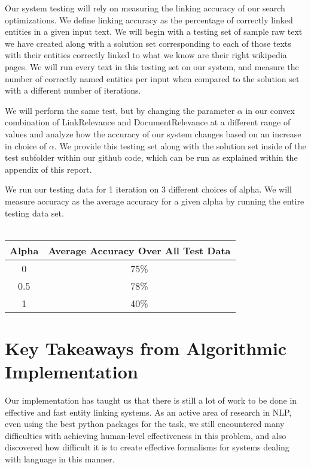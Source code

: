 \documentclass[twoside,11pt]{article}
\begin{document}
Our system testing will rely on measuring the linking accuracy of our search optimizations. We define linking accuracy as the percentage of correctly linked entities in a given input text. We will begin with a testing set of sample raw text we have created along with a solution set corresponding to each of those texts with their entities correctly linked to what we know are their right wikipedia pages. We will run every text in this testing set on our system, and measure the number of correctly named entities per input when compared to the solution set with a different number of iterations.

We will perform the same test, but by changing the parameter $\alpha$ in our convex combination of LinkRelevance and DocumentRelevance at a different range of values and analyze how the accuracy of our system changes based on an increase in choice of $\alpha$. We provide this testing set along with the solution set inside of the test subfolder within our github code, which can be run as explained within the appendix of this report.

We run our testing data for 1 iteration on 3 different choices of alpha. We will measure accuracy as the average accuracy for a given alpha by running the entire testing data set.
\\ \\
\begin{tabular}{cc}
\hline
\textbf{Alpha}            & \textbf{Average Accuracy Over All Test Data} \\ \hline
\multicolumn{1}{|c|}{0}   & \multicolumn{1}{c|}{75\%}                    \\ \hline
\multicolumn{1}{|c|}{0.5} & \multicolumn{1}{c|}{78\%}                    \\ \hline
\multicolumn{1}{|c|}{1}   & \multicolumn{1}{c|}{40\%}                    \\ \hline
\end{tabular}

\section{Key Takeaways from Algorithmic Implementation}

Our implementation has taught us that there is still a lot of work to be done in effective and fast entity linking systems. As an active area of research in NLP, even using the best python packages for the task, we still encountered many difficulties with achieving human-level effectiveness in this problem, and also discovered how difficult it is to create effective formalisms for systems dealing with language in this manner.
\end{document}
